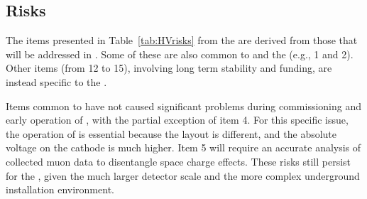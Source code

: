 \subsection{Risks}
\label{sec:fddp-hv-org-risk}

The items presented in %
Table~\ref{tab:HVrisks} from the  are derived from those that will be addressed in  %
.  Some of these are also common to  and the  (e.g., 1 and 2). Other  %
items (from 12 to 15), involving long term stability and funding, are instead specific to the  %
. 

Items common to   have not caused significant problems during commissioning and early operation of , with the partial exception of  %
item 4. For this specific issue, the operation of  is essential because the  layout is different, and the absolute voltage on the cathode is much higher. 
Item 5 will require an accurate analysis of collected muon data  %
to disentangle space charge effects. 
These risks still persist for the , %
given the much larger detector scale and the more complex underground installation environment.


